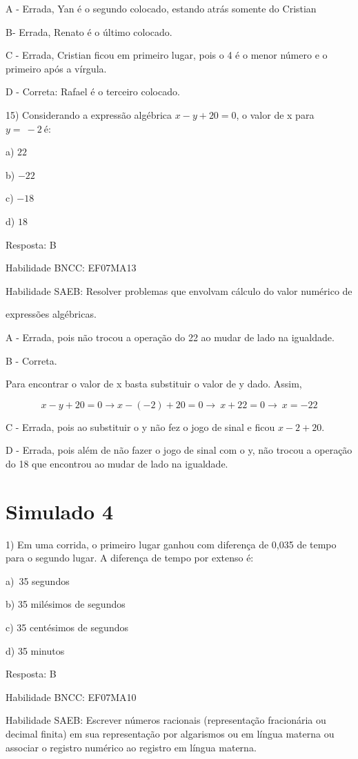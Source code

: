 {{{{{{{{{{{{{{{{A - Errada, Yan é o segundo colocado, estando atrás somente do Cristian

B- Errada, Renato é o último colocado.

C - Errada, Cristian ficou em primeiro lugar, pois o 4 é o menor número
e o primeiro após a vírgula.

D - Correta: Rafael é o terceiro colocado.

15) Considerando a expressão algébrica \(x - y + 20 = 0\), o valor de x
para \(y = \  - 2\ \)é:

a) \(22\)

b) \(- 22\)

c) \(- 18\)

d) \(18\)

Resposta: B

Habilidade BNCC: EF07MA13

Habilidade SAEB: Resolver problemas que envolvam cálculo do valor
numérico de

expressões algébricas.

A - Errada, pois não trocou a operação do 22 ao mudar de lado na
igualdade.

B - Correta.

Para encontrar o valor de x basta substituir o valor de y dado. Assim,

\[x - y + 20 = 0 \rightarrow x - ( - 2) + 20 = 0 \rightarrow \ x + 22 = 0 \rightarrow \ x = - 22\]

C - Errada, pois ao substituir o y não fez o jogo de sinal e ficou
\(x - 2 + 20\).

D - Errada, pois além de não fazer o jogo de sinal com o y, não trocou a
operação do 18 que encontrou ao mudar de lado na igualdade.

\hypertarget{simulado-4}{%
\section{Simulado 4}

1) Em uma corrida, o primeiro lugar ganhou com diferença de 0,035 de
tempo para o segundo lugar. A diferença de tempo por extenso é:

a)~35 segundos

b) 35 milésimos de segundos

c) 35 centésimos de segundos~

d) 35 minutos

Resposta: B~

Habilidade BNCC: EF07MA10

Habilidade SAEB: Escrever números racionais (representação fracionária
ou decimal finita) em sua representação por algarismos ou em língua
materna ou associar o registro numérico ao registro em língua materna.

}}}}}}}}}}}}}}}}}
